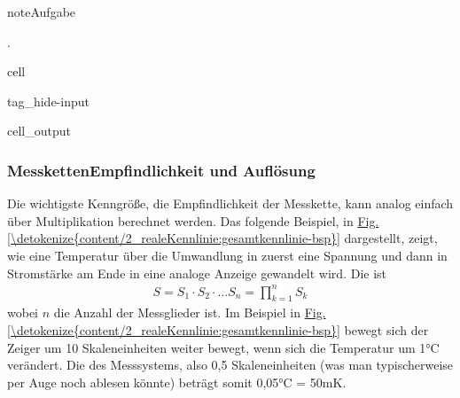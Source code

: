 \documentclass[letterpaper,10pt,english]{jupyterBook}
\begin{document}
\begin{sphinxadmonition}{note}{Aufgabe}

\sphinxAtStartPar
{}.
\end{sphinxadmonition}

\begin{sphinxuseclass}{cell}
\begin{sphinxuseclass}{tag_hide-input}\begin{sphinxVerbatimOutput}

\begin{sphinxuseclass}{cell_output}
\noindent{}

\noindent{}

\end{sphinxuseclass}\end{sphinxVerbatimOutput}

\end{sphinxuseclass}
\end{sphinxuseclass}

\subsubsection{Messketten\sphinxhyphen{}Empfindlichkeit und Auflösung}
\label{\detokenize{content/2_realeKennlinie:messketten-empfindlichkeit-und-auflosung}}
\sphinxAtStartPar
Die wichtigste Kenngröße, die Empfindlichkeit der Messkette, kann analog einfach über Multiplikation berechnet werden. Das folgende Beispiel, in \hyperref[\detokenize{content/2_realeKennlinie:gesamtkennlinie-bsp}]{Fig.\@ \ref{\detokenize{content/2_realeKennlinie:gesamtkennlinie-bsp}}} dargestellt, zeigt, wie eine Temperatur über die Umwandlung in zuerst eine Spannung und dann in Stromstärke am Ende in eine analoge Anzeige gewandelt wird. Die  ist
\begin{equation*}
\begin{split}S = S_1\cdot S_2 \cdot ... S_n = \prod_{k=1}^n S_k\end{split}
\end{equation*}
\sphinxAtStartPar
wobei \(n\) die Anzahl der Messglieder ist. Im Beispiel in \hyperref[\detokenize{content/2_realeKennlinie:gesamtkennlinie-bsp}]{Fig.\@ \ref{\detokenize{content/2_realeKennlinie:gesamtkennlinie-bsp}}} bewegt sich der Zeiger um 10 Skaleneinheiten weiter bewegt, wenn sich die Temperatur um 1°C verändert. Die  des Messsystems, also 0,5 Skaleneinheiten (was man typischerweise per Auge noch ablesen könnte) beträgt somit 0,05°C = 50mK.
\end{document}
